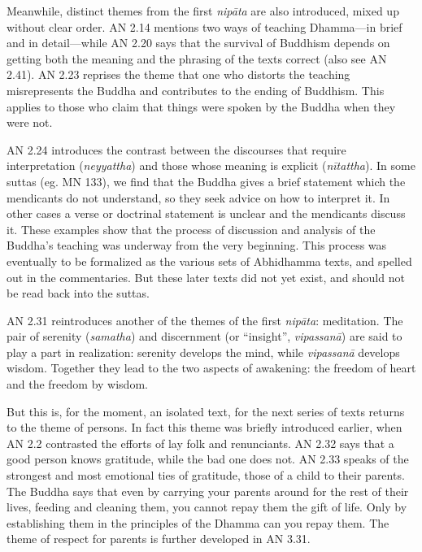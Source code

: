 \documentclass[12pt,openany]{book}%
\begin{document}
Meanwhile, distinct themes from the first \textit{\textsanskrit{nipāta}} are also introduced, mixed up without clear order. AN 2.14 mentions two ways of teaching Dhamma—in brief and in detail—while AN 2.20 says that the survival of Buddhism depends on getting both the meaning and the phrasing of the texts correct (also see AN 2.41). AN 2.23 reprises the theme that one who distorts the teaching misrepresents the Buddha and contributes to the ending of Buddhism. This applies to those who claim that things were spoken by the Buddha when they were not.

AN 2.24 introduces the contrast between the discourses that require interpretation (\textit{neyyattha}) and those whose meaning is explicit (\textit{\textsanskrit{nītattha}}). In some suttas (eg. MN 133), we find that the Buddha gives a brief statement which the mendicants do not understand, so they seek advice on how to interpret it. In other cases a verse or doctrinal statement is unclear and the mendicants discuss it. These examples show that the process of discussion and analysis of the Buddha’s teaching was underway from the very beginning. This process was eventually to be formalized as the various sets of Abhidhamma texts, and spelled out in the commentaries. But these later texts did not yet exist, and should not be read back into the suttas.

AN 2.31 reintroduces another of the themes of the first \textit{\textsanskrit{nipāta}}: meditation. The pair of serenity (\textit{samatha}) and discernment (or “insight”, \textit{\textsanskrit{vipassanā}}) are said to play a part in realization: serenity develops the mind, while \textit{\textsanskrit{vipassanā}} develops wisdom. Together they lead to the two aspects of awakening: the freedom of heart and the freedom by wisdom.

But this is, for the moment, an isolated text, for the next series of texts returns to the theme of persons. In fact this theme was briefly introduced earlier, when AN 2.2 contrasted the efforts of lay folk and renunciants. AN 2.32 says that a good person knows gratitude, while the bad one does not. AN 2.33 speaks of the strongest and most emotional ties of gratitude, those of a child to their parents. The Buddha says that even by carrying your parents around for the rest of their lives, feeding and cleaning them, you cannot repay them the gift of life. Only by establishing them in the principles of the Dhamma can you repay them. The theme of respect for parents is further developed in AN 3.31.
\end{document}
